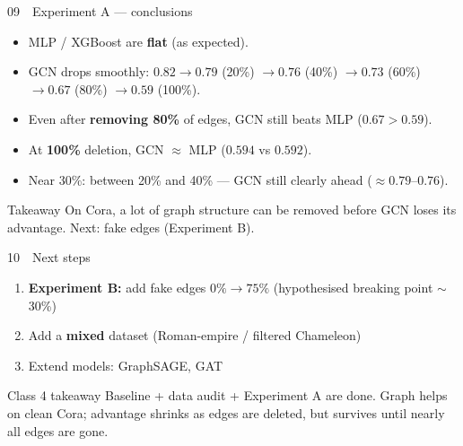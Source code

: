 \documentclass[
  english,
  aspectratio=169,
]{beamer}
\begin{document}
\begin{frame}{09~~Experiment A --- conclusions}
  \begin{itemize}
    \item MLP / XGBoost are \textbf{flat} (as expected).
    \item GCN drops smoothly: $0.82 \rightarrow 0.79$ (20\%)
      $\rightarrow 0.76$ (40\%) $\rightarrow 0.73$ (60\%)
      $\rightarrow 0.67$ (80\%) $\rightarrow 0.59$ (100\%).
    \item Even after \textbf{removing 80\%} of edges, GCN still beats MLP
      ($0.67 > 0.59$).
    \item At \textbf{100\%} deletion, GCN $\approx$ MLP ($0.594$ vs $0.592$).
    \item Near 30\%: between 20\% and 40\% --- GCN still clearly ahead
      ($\approx 0.79$--$0.76$).
  \end{itemize}

  \vspace{0.35em}
  \begin{block}{Takeaway}
    On Cora, a lot of graph structure can be removed before GCN loses its
    advantage. Next: fake edges (Experiment B).
  \end{block}
\end{frame}

\begin{frame}{10~~Next steps}
  \begin{enumerate}
    \item \textbf{Experiment B:} add fake edges $0\% \rightarrow 75\%$
      (hypothesised breaking point $\sim$30\%)
    \item Add a \textbf{mixed} dataset (Roman-empire / filtered Chameleon)
    \item Extend models: GraphSAGE, GAT
  \end{enumerate}

  \vspace{0.5em}
  \begin{block}{Class 4 takeaway}
    Baseline + data audit + Experiment A are done.
    Graph helps on clean Cora; advantage shrinks as edges are deleted,
    but survives until nearly all edges are gone.
  \end{block}
\end{frame}
\end{document}
